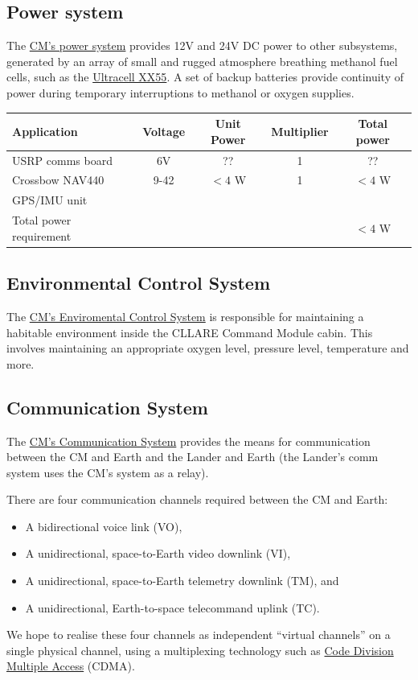 \documentclass{report}
\begin{document}
\subsection{Power system}

The \href{http://cstart.org/wiki/CLLARE_CM_Power_System}{CM's power system} provides 12V and 24V DC power to other subsystems, generated by an array of small and rugged atmosphere breathing methanol fuel cells, such as the \href{http://www.ultracellpower.com/assets/XX55_Data_Sheet_01-27-2009.pdf}{Ultracell XX55}.  A set of backup batteries provide continuity of power during temporary interruptions to methanol or oxygen supplies.

\begin{tabular}{ | l | c | c | c | c | }
\hline
Application & Voltage & Unit Power & Multiplier & Total power \\
\hline
\hline
USRP comms board & 6V & ?? & 1 & ?? \\
\hline
Crossbow NAV440 & 9-42 & $<4$ W & 1 & $<4$ W \\
GPS/IMU unit & & & & \\
\hline
\hline
Total power requirement & & & & $<4$ W \\
\hline
\end{tabular}
\subsection{Environmental Control System}

The \href{http://cstart.org/wiki/CLLARE_Environmental_Control_System}{CM's Enviromental Control System} is responsible for maintaining a habitable environment inside the CLLARE Command Module cabin. This involves maintaining an appropriate oxygen level, pressure level, temperature and more.

\subsection{Communication System}

The \href{http://cstart.org/wiki/CLLARE_CM_Communication_System}{CM's Communication System} provides the means for communication between the CM and Earth and the Lander and Earth (the Lander's comm system uses the CM's system as a relay).

There are four communication channels required between the CM and Earth:
\begin{itemize}
\item A bidirectional voice link (VO),
\item A unidirectional, space-to-Earth video downlink (VI),
\item A unidirectional, space-to-Earth telemetry downlink (TM), and
\item A unidirectional, Earth-to-space telecommand uplink (TC).
\end{itemize}
We hope to realise these four channels as independent ``virtual channels'' on a single physical channel, using a multiplexing technology such as \href{http://en.wikipedia.org/wiki/Code_division_multiple_access}{Code Division Multiple Access} (CDMA).
\end{document}
